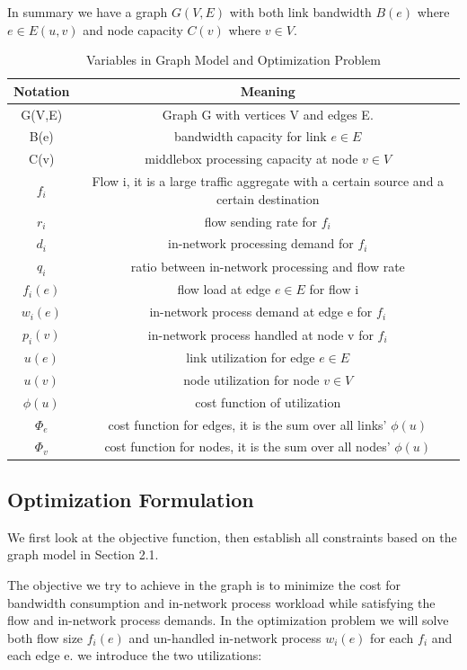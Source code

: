\documentclass[twocolumn]{article}
\begin{document}
In summary we have a graph $G(V,E)$ with both link bandwidth $B(e)$ where $e \in E(u,v)$ and node capacity $C(v)$ where $v \in V$. 
\begin{table}
\begin{tabular} {|c |c |}
\hline
Notation&Meaning\\ \hline
G(V,E)&Graph G with vertices V and edges E.\\ \hline
B(e)&bandwidth capacity for link $e \in E$\\ \hline
C(v)&middlebox processing capacity at node $v \in V$\\ \hline
$f_i$& Flow i, it is a large traffic aggregate with a certain source and a certain destination\\ \hline
$r_i$&flow sending rate for $f_i$\\ \hline
$d_i$&in-network processing demand for $f_i$\\ \hline
$q_i$&ratio between in-network processing and flow rate\\ \hline
$ f_i(e)$&flow load at edge $e\in E $ for flow i\\ \hline
$ w_i(e)$&in-network process demand at edge e for $f_i$\\ \hline
$p_i(v)$&in-network process handled at node v for $f_i$\\ \hline
$u(e) $&link utilization for edge $ e \in E $\\ \hline
$u(v)$&node utilization for node $ v \in V$\\ \hline
$\phi(u)$&cost function of utilization\\ \hline
$\Phi_e$&cost function for edges, it is the sum over all links' $\phi(u)$\\ \hline
$\Phi_v$&cost function for nodes,  it is the sum over all nodes' $\phi(u)$\\\hline
\end{tabular}
\centering
\caption{Variables in Graph Model and Optimization Problem}
\end{table}
 
\subsection{Optimization Formulation}\label{optimization}
We first look at the objective function, then establish all constraints based on the graph model in Section 2.1.

The objective we try to achieve in the graph is to minimize the cost for bandwidth consumption and in-network process workload while satisfying the flow and in-network process demands. In the optimization problem we will solve both flow size $f_i(e)$ and un-handled in-network process $w_i(e)$ for each $f_i$ and each edge e. we introduce the two utilizations: 
\end{document}
